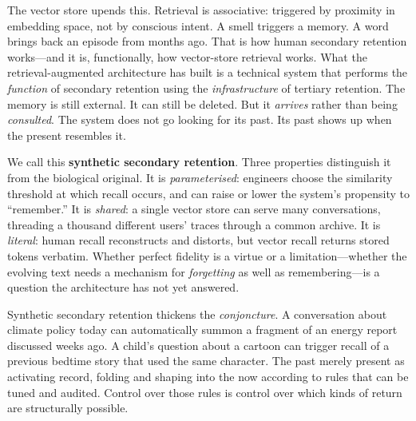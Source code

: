 The vector store upends this. Retrieval is associative: triggered by proximity in embedding space, not by conscious intent. A smell triggers a memory. A word brings back an episode from months ago. That is how human secondary retention works---and it is, functionally, how vector-store retrieval works. What the retrieval-augmented architecture has built is a technical system that performs the \emph{function} of secondary retention using the \emph{infrastructure} of tertiary retention. The memory is still external. It can still be deleted. But it \emph{arrives} rather than being \emph{consulted}. The system does not go looking for its past. Its past shows up when the present resembles it.

We call this \textbf{synthetic secondary retention}. Three properties distinguish it from the biological original. It is \emph{parameterised}: engineers choose the similarity threshold at which recall occurs, and can raise or lower the system's propensity to ``remember.'' It is \emph{shared}: a single vector store can serve many conversations, threading a thousand different users' traces through a common archive. It is \emph{literal}: human recall reconstructs and distorts, but vector recall returns stored tokens verbatim. Whether perfect fidelity is a virtue or a limitation---whether the evolving text needs a mechanism for \emph{forgetting} as well as remembering---is a question the architecture has not yet answered.

Synthetic secondary retention thickens the \emph{conjoncture}. A conversation about climate policy today can automatically summon a fragment of an energy report discussed weeks ago. A child's question about a cartoon can trigger recall of a previous bedtime story that used the same character. The past merely present as activating record, folding and shaping into the now according to rules that can be tuned and audited. Control over those rules is control over which kinds of return are structurally possible.


